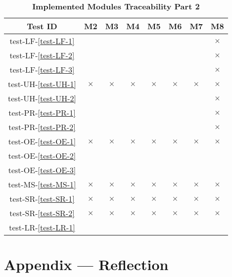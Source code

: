 \documentclass[12pt, titlepage]{article}
\begin{document}
\begin{table}[H]
\centering
\begin{tabular}{|c|c|c|c|c|c|c|c|}
\hline
Test ID & M2 & M3 & M4 & M5 & M6 & M7 & M8 \\
\hline
test-LF-\ref{test-LF-1} & & & & & & & $\times$ \\
\hline
test-LF-\ref{test-LF-2} & & & & & & & $\times$ \\
\hline
test-LF-\ref{test-LF-3} & & & & & & & $\times$ \\
\hline
test-UH-\ref{test-UH-1} & $\times$ & $\times$ & $\times$ & $\times$ & $\times$ & $\times$ & $\times$ \\
\hline
test-UH-\ref{test-UH-2} & & & & & & & $\times$ \\
\hline
test-PR-\ref{test-PR-1} & & & & & & & $\times$ \\
\hline
test-PR-\ref{test-PR-2} & & & & & & & $\times$ \\
\hline
test-OE-\ref{test-OE-1} & $\times$ & $\times$ & $\times$ & $\times$ & $\times$ & $\times$ & $\times$ \\
\hline
test-OE-\ref{test-OE-2} & & & & & & & \\
\hline
test-OE-\ref{test-OE-3} & & & & & & & \\
\hline
test-MS-\ref{test-MS-1} & $\times$ & $\times$ & $\times$ & $\times$ & $\times$ & $\times$ & $\times$ \\
\hline
test-SR-\ref{test-SR-1} & $\times$ & $\times$ & $\times$ & $\times$ & $\times$ & $\times$ & $\times$ \\
\hline
test-SR-\ref{test-SR-2} & $\times$ & $\times$ & $\times$ & $\times$ & $\times$ & $\times$ & $\times$ \\
\hline
test-LR-\ref{test-LR-1} & & & & & & & \\
\hline
\end{tabular}
\caption{\bf Implemented Modules Traceability Part 2}
\end{table}





\newpage{}
\section*{Appendix --- Reflection}
\end{document}

